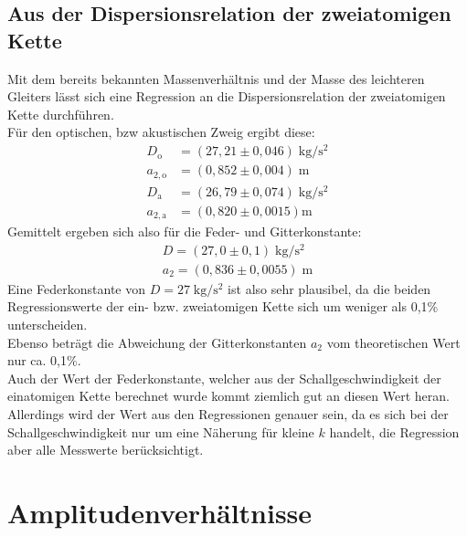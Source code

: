 \subsection{Aus der Dispersionsrelation der zweiatomigen Kette}

Mit dem bereits bekannten Massenverhältnis und der Masse des leichteren Gleiters lässt sich eine Regression an die Dispersionsrelation der zweiatomigen Kette durchführen.\\
Für den optischen, bzw akustischen Zweig ergibt diese:
\begin{align}
	D_\textrm{o} &= (27,21 \pm 0,046)\;\si{\kilogram\per\square\second}\\
	a_{2,\textrm{o}} &= (0,852 \pm 0,004)\;\si{\meter}\\
	D_\textrm{a} &= (26,79 \pm 0,074)\;\si{\kilogram\per\square\second}\\
	a_{2,\textrm{a}} &= (0,820 \pm 0,0015)\si{\si{\meter}}
\end{align}
Gemittelt ergeben sich also für die Feder- und Gitterkonstante:
\begin{align}
	D = (27,0 \pm 0,1)\;\si{\kilogram\per\square\second}\\
	a_2 = (0,836 \pm 0,0055)\;\si{\meter}
\end{align}
Eine Federkonstante von $D = 27\;\si{\kilogram\per\square\second}$ ist also sehr plausibel, da die beiden Regressionswerte der ein- bzw. zweiatomigen Kette sich um weniger als 0,1\;\% unterscheiden.\\
Ebenso beträgt die Abweichung der Gitterkonstanten $a_2$ vom theoretischen Wert nur ca. 0,1\;\%.\\
Auch der Wert der Federkonstante, welcher aus der Schallgeschwindigkeit der einatomigen Kette berechnet wurde kommt ziemlich gut an diesen Wert heran. Allerdings wird der Wert aus den Regressionen genauer sein, da es sich bei der Schallgeschwindigkeit nur um eine Näherung für kleine $k$ handelt, die Regression aber alle Messwerte berücksichtigt.
\section{Amplitudenverhältnisse}


